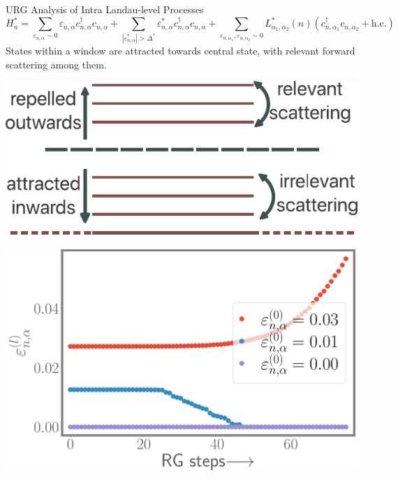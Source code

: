 \documentclass[12pt,aspectratio=169]{beamer}
\begin{document}
\begin{frame}{URG Analysis of Intra Landau-level Processes}
\[
	H_n^* = \sum_{\varepsilon_{n,\alpha} \sim 0}\varepsilon_{n,\alpha} c^\dagger_{n, \alpha} c_{n,\alpha} + \sum_{|\varepsilon^*_{n,\alpha}| > \Delta^*}\varepsilon^*_{n,\alpha}c^\dagger_{n,\alpha} c_{n,\alpha} + \sum_{\varepsilon_{n,\alpha_1}, \varepsilon_{n,\alpha_2} \sim 0}L_{\alpha_1,\alpha_2}^*(n)\left(c^\dagger_{n, \alpha_1}c_{n,\alpha_2} + \text{h.c.}\right)
\]
States within a window are attracted towards central state, with relevant forward scattering among them.

\begin{minipage}{0.45\textwidth}
	\includegraphics[width=\textwidth]{intraLL.pdf}
\end{minipage}
\hspace*{\fill}
\begin{minipage}{0.4\textwidth}
	\includegraphics[width=\textwidth]{intraLL_epsRG.pdf}
\end{minipage}
\end{frame}
\end{document}
